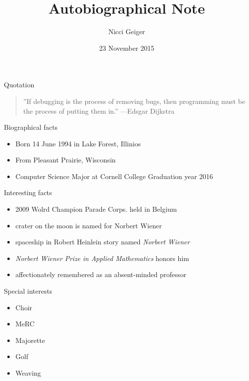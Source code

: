 \documentclass{beamer}
\title{Autobiographical Note}
\author{Nicci Geiger}
\institute{Cornell College}
\date{23 November 2015}
\begin{document}
\begin{frame}
  \titlepage
\end{frame}

\begin{frame}{Quotation}
\begin{quotation}
\noindent
''If debugging is the process of removing bugs, then programming must be the process of putting them in.''
  \flushright
  ---Edsgar Dijkstra
  \end{quotation}
\end{frame}

\begin{frame}{Biographical facts}
\begin{itemize}
  \item Born 14 June 1994 in Lake Forest, Illinios
  \item From Pleasant Prairie, Wisconsin
  \item Computer Science Major at Cornell College Graduation year 2016
  \end{itemize}
\end{frame}

\begin{frame}{Interesting facts}
\begin{itemize}
  \item 2009 Wolrd Champion Parade Corps. held in Belgium
  
  
  
  \item crater on the moon is named for Norbert Wiener
  \item spaceship in Robert Heinlein story
    named \emph{Norbert Wiener}
  \item \emph{Norbert Wiener Prize in Applied Mathematics} honors him
  \item affectionately remembered as an absent-minded professor
  \end{itemize}
\end{frame}

\begin{frame}{Special interests}
\begin{itemize}
  \item Choir
  \item MeRC
  \item Majorette
  \item Golf
  \item Weaving
  \end{itemize}
\end{frame}
\end{document}
